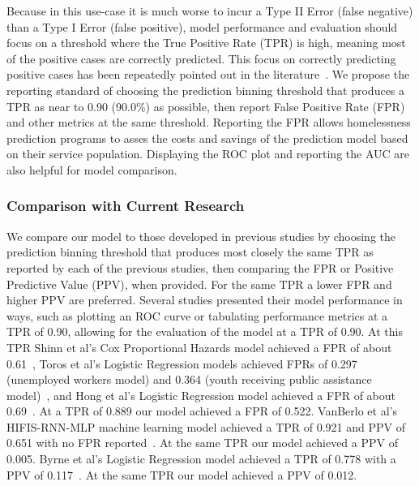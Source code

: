 \documentclass[10pt,letterpaper]{article}
\begin{document}
Because in this use-case it is much worse to incur a Type II Error (false negative) than a Type I Error (false positive), model performance and evaluation should focus on a threshold where the True Positive Rate (TPR) is high, meaning most of the positive cases are correctly predicted. This focus on correctly predicting positive cases has been repeatedly pointed out in the literature~\cite{vanberlo2021interpretable,hong2018applications}. We propose the reporting standard of choosing the prediction binning threshold that produces a TPR as near to 0.90 (90.0\%) as possible, then report False Positive Rate (FPR) and other metrics at the same threshold. Reporting the FPR allows homelessness prediction programs to asses the costs and savings of the prediction model based on their service population. Displaying the ROC plot and reporting the AUC are also helpful for model comparison. 

\subsubsection*{Comparison with Current Research}
We compare our model to those developed in previous studies by choosing the prediction binning threshold that produces most closely the same TPR as reported by each of the previous studies, then comparing the FPR or Positive Predictive Value (PPV), when provided. For the same TPR a lower FPR and higher PPV are preferred. Several studies presented their model performance in ways, such as plotting an ROC curve or tabulating performance metrics at a TPR of 0.90, allowing for the evaluation of the model at a TPR of 0.90. At this TPR Shinn et al's Cox Proportional Hazards model achieved a FPR of about 0.61~\cite{shinn2013efficient}, Toros et al's Logistic Regression models achieved FPRs of 0.297 (unemployed workers model) and 0.364 (youth receiving public assistance model)~\cite{toros2019early}, and Hong et al's Logistic Regression model achieved a FPR of about 0.69~\cite{hong2018applications}. At a TPR of 0.889 our model achieved a FPR of 0.522. VanBerlo et al's HIFIS-RNN-MLP machine learning model achieved a TPR of 0.921 and PPV of 0.651 with no FPR reported~\cite{vanberlo2021interpretable}. At the same TPR our model achieved a PPV of 0.005. Byrne et al's Logistic Regression model achieved a TPR of 0.778 with a PPV of 0.117~\cite{byrne2020classification}. At the same TPR our model achieved a PPV of 0.012.
\end{document}
